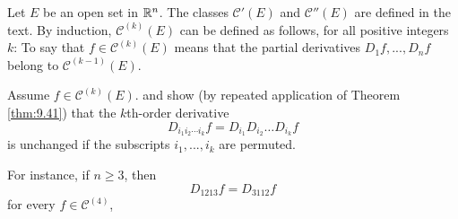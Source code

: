 \begin{myexercise}
    \label{ex:9.29}
    Let $E$ be an open set in ${\protect\mathbb R}^n$. 
    The classes $\mathscr{C}'(E)$ and $\mathscr{C}''(E)$ are defined in the text.
    By induction, $\mathscr{C}^{(k)} (E)$ can be defined as follows, for all positive integers $k$: 
    To say that $f \in \mathscr{C}^{(k)} (E)$ means that the partial derivatives $D_1 f, ... , D_n f$ belong to $\mathscr{C}^{(k-1)} (E)$.

    Assume $f \in \mathscr{C}^{(k)} (E)$. and show 
    (by repeated application of Theorem \ref{thm:9.41}) 
    that the $k$th-order derivative
    \begin{equation*}
        D_{i_1 i_2 \cdots i_k} f = D_{i_1} D_{i_2} \dots D_{i_k} f
    \end{equation*}
    is unchanged if the subscripts $i_1, ... , i_k$ are permuted.

    For instance, if $n \geq 3$, then
    \begin{equation*}
        D_{1213} f = D_{3112} f
    \end{equation*}
    for every $f \in \mathscr{C}^{(4)}$,
\end{myexercise}


